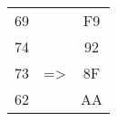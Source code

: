 \begin{tabular}{|c|c|c|}
  \cline{1-1} \cline{3-3}
  69 &  & F9 \\ \cline{1-1} \cline{3-3} 
  74 &  & 92 \\ \cline{1-1} \cline{3-3} 
  73 & =\textgreater{} & 8F \\ \cline{1-1} \cline{3-3} 
  62 &  & AA \\ \cline{1-1} \cline{3-3} 
\end{tabular}